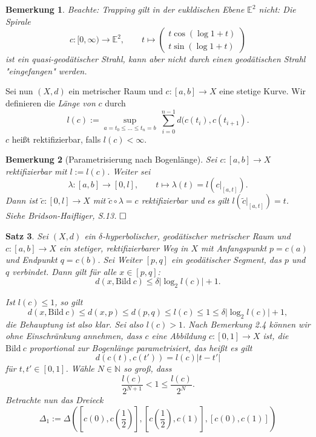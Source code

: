 \documentclass[11pt]{book}
\numberwithin{dummy}{section}
\newtheorem{theorem}{Satz}[section]
\newtheorem{remark}[theorem]{Bemerkung}
\theoremstyle{nonumberbreak}
\newenvironment{pr}[1][]{\ifthenelse{\equal{#1}{}}{\proof}{\proof[#1]}\rm}{\endproof}
\newcommand{\E}{\mathbb{E}}
\newcommand{\la}{\longrightarrow}
\begin{document}
\begin{spacing}{1.4}
\begin{remark}
Beachte: Trapping gilt in der eukldischen Ebene $\E^2$ nicht: Die Spirale
$$c:[0,\infty) \la \E^2, \qquad t \mapsto \begin{pmatrix} t \cos \left( \log 1+t \right) \\ t \sin \left( \log 1+t\right) \end{pmatrix}$$
ist ein quasi-geodätischer Strahl, kann aber nicht durch einen geodätischen Strahl "eingefangen" werden.

\end{remark}



Sei nun $(X,d)$ ein metrischer Raum und $c:[a,b] \la X$ eine stetige Kurve. Wir definieren die \textit{Länge von} $c$ durch 
$$l(c) := \sup_{a=t_0 \leqslant \ldots \leqslant t_n=b} \ \sum_{i=0}^{n-1} d(c(t_i), c(t_{i+1}).$$
$c$ heißt rektifizierbar, falls $l(c) < \infty$.

\begin{remark}[Parametrisierung nach Bogenlänge]
Sei $c:[a,b] \la X$ rektifizierbar mit $l:=l(c)$. Weiter sei 
$$\lambda:[a,b] \la [0,l], \qquad t \mapsto \lambda(t) = l\left( c\vert_{[a,t]}\right).$$
Dann ist $\tilde{c}:[0,l] \la X$ mit $\tilde{c} \circ \lambda = c$ rektifizierbar und es gilt $l\left( \tilde{c}\vert_{[a,t]}\right) = t$.
\begin{pr}
Siehe Bridson-Haifliger, S.13. $\hfill \Box$
\end{pr}
\end{remark}

\begin{theorem}
Sei $(X,d)$ ein $\delta$-hyperbolischer, geodätischer metrischer Raum und $c:[a,b]\la X$ ein stetiger, rektifizierbarer Weg in $X$ mit Anfangspunkt $p=c(a)$ und Endpunkt $q=c(b)$. Sei Weiter $[p,q]$ ein geodätischer Segment, das $p$ und $q$ verbindet. Dann gilt für alle $x \in [p,q]$:
$$d \left( x, \mathrm{Bild} \ c\right) \leqslant \delta \vert \log_2 l(c)\vert +1.$$

\begin{pr}
Ist $l(c) \leqslant 1$, so gilt 
$$d(x, \mathrm{Bild} \ c) \leqslant d(x,p) \leqslant d(p,q) \leqslant l(c) \leqslant 1 \leqslant \delta \vert \log_2 l(c) \vert +1,$$
die Behauptung ist also klar. Sei also $l(c) >1$. Nach Bemerkung 2.4 können wir ohne Einschränkung annehmen, dass $c$ eine Abbildung $c:[0,1] \la X$ ist, die $\mathrm{Bild} \ c$ proportional zur Bogenlänge parametrisiert, das heißt es gilt 
$$d(c(t), c(t')) = l(c) \vert t-t'\vert$$
für $t,t' \in [0,1]$. Wähle $N \in \mathbb{N}$ so groß, dass 
$$\frac{l(c)}{2^{N+1}} < 1 \leqslant \frac{l(c)}{2^N}.$$
Betrachte nun das Dreieck
$$\Delta_1:= \Delta \left( \left[c(0), c\left(\frac{1}{2}\right)\right], \left[ c\left(\frac{1}{2}\right), c(1)\right], \left[ c(0), c(1) \right] \right)$$


\end{pr}
\end{theorem}
\end{spacing}
\end{document}
